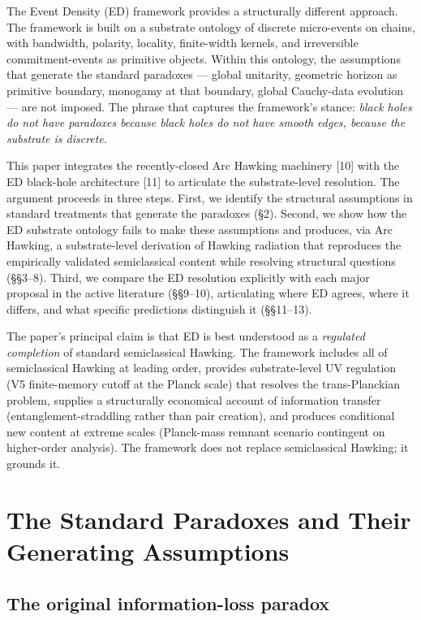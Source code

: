 \documentclass[11pt,a4paper]{article}
\begin{document}
The Event Density (ED) framework provides a structurally different approach. The framework is built on a substrate ontology of discrete micro-events on chains, with bandwidth, polarity, locality, finite-width kernels, and irreversible commitment-events as primitive objects. Within this ontology, the assumptions that generate the standard paradoxes --- global unitarity, geometric horizon as primitive boundary, monogamy at that boundary, global Cauchy-data evolution --- are not imposed. The phrase that captures the framework's stance: \emph{black holes do not have paradoxes because black holes do not have smooth edges, because the substrate is discrete}.

This paper integrates the recently-closed Arc Hawking machinery [10] with the ED black-hole architecture [11] to articulate the substrate-level resolution. The argument proceeds in three steps. First, we identify the structural assumptions in standard treatments that generate the paradoxes (\S2). Second, we show how the ED substrate ontology fails to make these assumptions and produces, via Arc Hawking, a substrate-level derivation of Hawking radiation that reproduces the empirically validated semiclassical content while resolving structural questions (\S\S3--8). Third, we compare the ED resolution explicitly with each major proposal in the active literature (\S\S9--10), articulating where ED agrees, where it differs, and what specific predictions distinguish it (\S\S11--13).

The paper's principal claim is that ED is best understood as a \emph{regulated completion} of standard semiclassical Hawking. The framework includes all of semiclassical Hawking at leading order, provides substrate-level UV regulation (V5 finite-memory cutoff at the Planck scale) that resolves the trans-Planckian problem, supplies a structurally economical account of information transfer (entanglement-straddling rather than pair creation), and produces conditional new content at extreme scales (Planck-mass remnant scenario contingent on higher-order analysis). The framework does not replace semiclassical Hawking; it grounds it.

\section{The Standard Paradoxes and Their Generating Assumptions}

\subsection{The original information-loss paradox}
\end{document}
